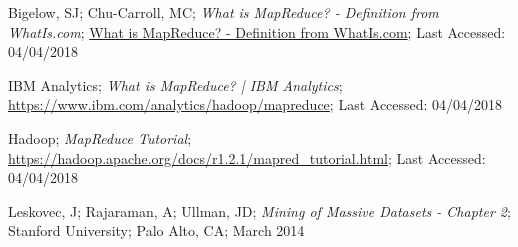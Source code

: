 \documentclass[10pt, conference]{IEEEtran}
\begin{document}
\begin{thebibliography}{}

Bigelow, SJ; Chu-Carroll, MC; \emph{What is MapReduce? - Definition from WhatIs.com}; \url{What is MapReduce? - Definition from WhatIs.com}; Last Accessed: 04/04/2018

IBM Analytics; \emph{What is MapReduce? | IBM Analytics}; \url{https://www.ibm.com/analytics/hadoop/mapreduce}; Last Accessed: 04/04/2018

Hadoop; \emph{MapReduce Tutorial}; \url{https://hadoop.apache.org/docs/r1.2.1/mapred_tutorial.html}; Last Accessed: 04/04/2018

Leskovec, J; Rajaraman, A; Ullman, JD; \emph{Mining of Massive Datasets - Chapter 2}; Stanford University; Palo Alto, CA; March 2014

\end{thebibliography}




\end{document}
